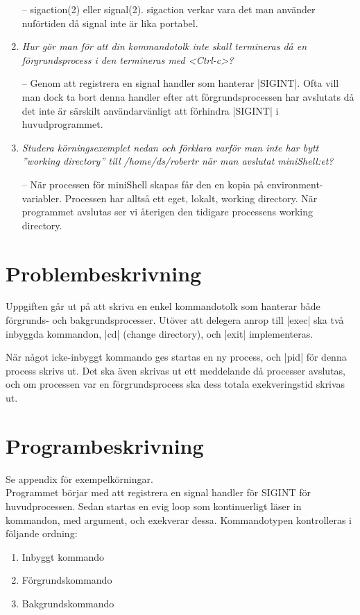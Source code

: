 \documentclass[paper=a4, fontsize=11pt]{scrartcl} %
\numberwithin{equation}{section} %
\numberwithin{figure}{section} %
\numberwithin{table}{section} %
\begin{document}
\begin{enumerate}[1)]
-- sigaction(2) eller signal(2). sigaction verkar vara det man använder nuförtiden då signal inte är lika portabel.

\item
\emph{Hur gör man för att din kommandotolk inte skall termineras 
då en förgrundsprocess i den termineras med <Ctrl-c>?}

-- Genom att registrera en signal handler som hanterar |SIGINT|.
Ofta vill man dock ta bort denna handler efter att förgrundsprocessen har avslutats
då det inte är särskilt användarvänligt att förhindra |SIGINT| i huvudprogrammet.

\item
\emph{Studera körningsexemplet nedan och förklara varför man inte har bytt 
''working directory'' till /home/ds/robertr när man avslutat miniShell:et?}

-- När processen för miniShell skapas får den en kopia på environment-variabler. Processen har alltså ett eget, lokalt, working directory. När programmet avslutas ser vi återigen den tidigare processens working directory.

\end{enumerate}

\section{Problembeskrivning}

Uppgiften går ut på att skriva en enkel kommandotolk 
som hanterar både förgrunds- och bakgrundsprocesser.
Utöver att delegera anrop till |exec| ska två inbyggda kommandon,
 |cd| (change directory), och |exit| implementeras.

När något icke-inbyggt kommando ges startas en ny process, och |pid| för denna process skrivs ut.
Det ska även skrivas ut ett meddelande då processer avslutas, och om processen var en förgrundsprocess ska dess totala exekveringstid skrivas ut.


\section{Programbeskrivning}

Se appendix för exempelkörningar.\\

Programmet börjar med att registrera en signal handler för SIGINT för huvudprocessen.
Sedan startas en evig loop som kontinuerligt läser in kommandon, med argument, och exekverar dessa.
Kommandotypen kontrolleras i följande ordning:
\begin{enumerate}
\item{Inbyggt kommando}
\item{Förgrundskommando}
\item{Bakgrundskommando}
\end{enumerate}
\end{document}
